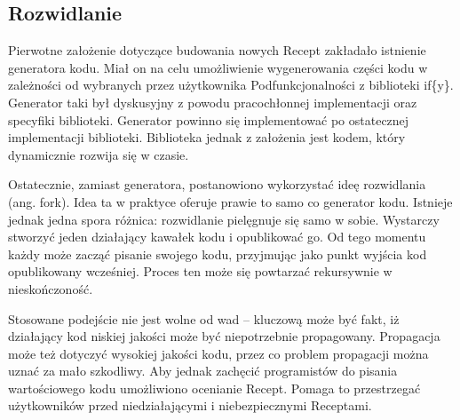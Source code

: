 \documentclass[11pt,a4paper,polish,thesis]{dcsbook}
\begin{document}
\subsection{Rozwidlanie}
Pierwotne założenie dotyczące budowania nowych Recept zakładało istnienie generatora kodu. Miał on na celu umożliwienie wygenerowania części kodu w zależności od
wybranych przez użytkownika Podfunkcjonalności z biblioteki if\{y\}. Generator taki był dyskusyjny z powodu pracochłonnej implementacji oraz specyfiki biblioteki.
Generator powinno się implementować po ostatecznej implementacji biblioteki. Biblioteka jednak z założenia jest kodem, który dynamicznie rozwija się w czasie.

Ostatecznie, zamiast generatora, postanowiono wykorzystać ideę rozwidlania (ang. fork). Idea ta w praktyce oferuje prawie to samo co generator kodu. Istnieje jednak
jedna spora różnica: rozwidlanie pielęgnuje się samo w sobie. Wystarczy stworzyć jeden działający kawałek kodu i opublikować go. Od tego momentu każdy może zacząć pisanie swojego kodu, przyjmując jako punkt wyjścia kod opublikowany wcześniej. Proces ten może się powtarzać rekursywnie w nieskończoność.

Stosowane podejście nie jest wolne od wad -- kluczową może być fakt, iż działający kod niskiej jakości może być niepotrzebnie propagowany. Propagacja może też
dotyczyć wysokiej jakości kodu, przez co problem propagacji można uznać za mało szkodliwy. Aby jednak zachęcić programistów do pisania wartościowego
kodu umożliwiono ocenianie Recept. Pomaga to przestrzegać użytkowników przed niedziałającymi i niebezpiecznymi Receptami.
\end{document}
